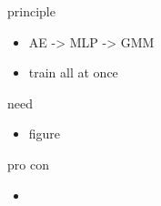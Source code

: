 \documentclass[../description.tex]{subfiles}
\begin{document}
    \item principle
    \begin{itemize}
        \item AE -> MLP -> GMM
        \item train all at once 
    \end{itemize}
    \item need 
    \begin{itemize}
        \item figure
    \end{itemize}
    \item pro con 
    \begin{itemize}
        \item 
    \end{itemize}
\end{document}

